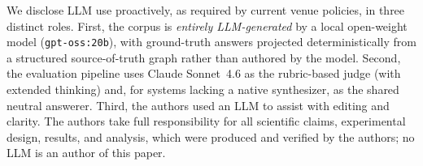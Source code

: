 We disclose LLM use proactively, as required by current venue policies, in three
distinct roles. First, the \bench{} corpus is \emph{entirely LLM-generated} by a
local open-weight model (\texttt{gpt-oss:20b}), with ground-truth answers
projected deterministically from a structured source-of-truth graph rather than
authored by the model. Second, the evaluation pipeline uses Claude Sonnet~4.6 as
the rubric-based judge (with extended thinking) and, for systems lacking a native
synthesizer, as the shared neutral answerer. Third, the authors used an LLM to
assist with editing and clarity. The authors take full responsibility for all
scientific claims, experimental design, results, and analysis, which were
produced and verified by the authors; no LLM is an author of this paper.
